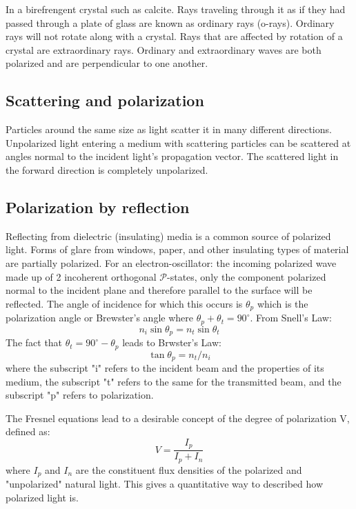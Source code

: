 \documentclass[12pt]{report}
\begin{document}
In a birefrengent crystal such as calcite. Rays  traveling through it as if they had passed through a plate of glass are known as ordinary rays (o-rays). Ordinary rays will not rotate along with a crystal. Rays that are affected by rotation of a crystal are extraordinary rays. Ordinary and extraordinary waves are both polarized and are perpendicular to one another. 

\subsection{Scattering and polarization}
Particles around the same size as light scatter it in many different directions. Unpolarized light entering a medium with scattering particles can be scattered at angles normal to the incident light's propagation vector. The scattered light in the forward direction is completely unpolarized.  

\subsection{Polarization by reflection}
Reflecting from dielectric (insulating) media is a common source of polarized light. Forms of glare from windows, paper, and other insulating types of material are partially polarized. For an electron-oscillator: the incoming polarized wave made up of 2 incoherent orthogonal $\mathcal{P}$-states, only the component polarized normal to the incident plane and therefore parallel to the surface will be reflected. The angle of incidence for which this occurs is $\theta_p$ which is the polarization angle or Brewster's angle where $\theta_p+\theta_t=90^\circ$. From Snell's Law:
\begin{equation}
n_i \sin \theta_p = n_t \sin \theta_t
\end{equation}
The fact that $\theta_t = 90^\circ - \theta_p$ leads to Brwster's Law:
\begin{equation}
\tan \theta_p = n_t/n_i
\end{equation}
where the subscript "i" refers to the incident beam and the properties of its medium, the subscript "t" refers to the same for the transmitted beam, and the subscript "p" refers to polarization. 

The Fresnel equations lead to a desirable concept of the degree of polarization V, defined as:
\begin{equation}
V = \frac{I_p}{I_p+I_n}
\end{equation}
where $I_p$ and $I_n$ are the constituent flux densities of the polarized and "unpolarized" natural light. This gives a quantitative way to described how polarized light is. 
\end{document}
